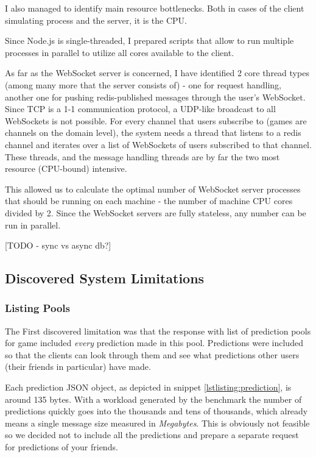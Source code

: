 \documentclass{uvamscse}
\begin{document}
I also managed to identify main resource bottlenecks. Both in cases of the client simulating process and the server, it is the CPU.

Since Node.js is single-threaded, I prepared scripts that allow to run multiple processes in parallel to utilize all cores available to the client.

As far as the WebSocket server is concerned, I have identified 2 core thread types (among many more that the server consists of) - one for request handling, another one for pushing redis-published messages through the user's WebSocket. Since TCP is a 1-1 communication protocol, a UDP-like broadcast to all WebSockets is not possible. For every channel that users subscribe to (games are channels on the domain level), the system needs a thread that listens to a redis channel and iterates over a list of WebSockets of users subscribed to that channel. These threads, and the message handling threads are by far the two most resource (CPU-bound) intensive.

This allowed us to calculate the optimal number of WebSocket server processes that should be running on each machine - the number of machine CPU cores divided by 2. Since the WebSocket servers are fully stateless, any number can be run in parallel.

[TODO - sync vs async db?]

\subsection{Discovered System Limitations}\label{Discovered System Limitations}

\subsubsection{Listing Pools}
The First discovered limitation was that the response with list of prediction pools for game included \textit{every} prediction made in this pool. Predictions were included so that the clients can look through them and see what predictions other users (their friends in particular) have made.

Each prediction JSON object, as depicted in snippet \ref{lstlisting:prediction}, is around 135 bytes. With a workload generated by the benchmark the number of predictions quickly goes into the thousands and tens of thousands, which already means a single message size measured in \textit{Megabytes}. This is obviously not feasible so we decided not to include all the predictions and prepare a separate request for predictions of your friends.
\end{document}
